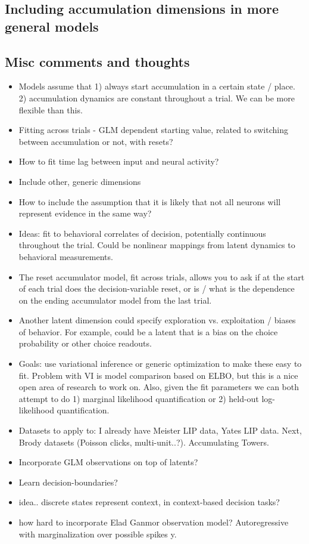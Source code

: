 \documentclass{article}
\begin{document}
\subsection{Including accumulation dimensions in more general models}


\subsection{Misc comments and thoughts}
\begin{itemize}
\item Models assume that 1) always start accumulation in a certain state / place. 2) accumulation dynamics are constant throughout a trial. We can be more flexible than this. 
\item Fitting across trials - GLM dependent starting value, related to switching between accumulation or not, with resets?
\item How to fit time lag between input and neural activity? 
\item Include other, generic dimensions 
\item How to include the assumption that it is likely that not all neurons will represent evidence in the same way? 
\item Ideas: fit to behavioral correlates of decision, potentially continuous throughout the trial. Could be nonlinear mappings from latent dynamics to behavioral measurements. 
\item The reset accumulator model, fit across trials, allows you to ask if at the start of each trial does the decision-variable reset, or is / what is the dependence on the ending accumulator model from the last trial. 
\item Another latent dimension could specify exploration vs. exploitation / biases of behavior. For example, could be a latent that is a bias on the choice probability or other choice readouts. 
\item Goals: use variational inference or generic optimization to make these easy to fit. Problem with VI is model comparison based on ELBO, but this is a nice open area of research to work on. Also, given the fit parameters we can both attempt to do 1) marginal likelihood quantification or 2) held-out log-likelihood quantification. 
\item Datasets to apply to: I already have Meister LIP data, Yates LIP data. Next, Brody datasets (Poisson clicks, multi-unit..?). Accumulating Towers. 
\item Incorporate GLM observations on top of latents? 
\item Learn decision-boundaries?
\item idea.. discrete states represent context, in context-based decision tasks? 
\item how hard to incorporate Elad Ganmor observation model? Autoregressive with marginalization over possible spikes y. 
\end{itemize}
\end{document}
